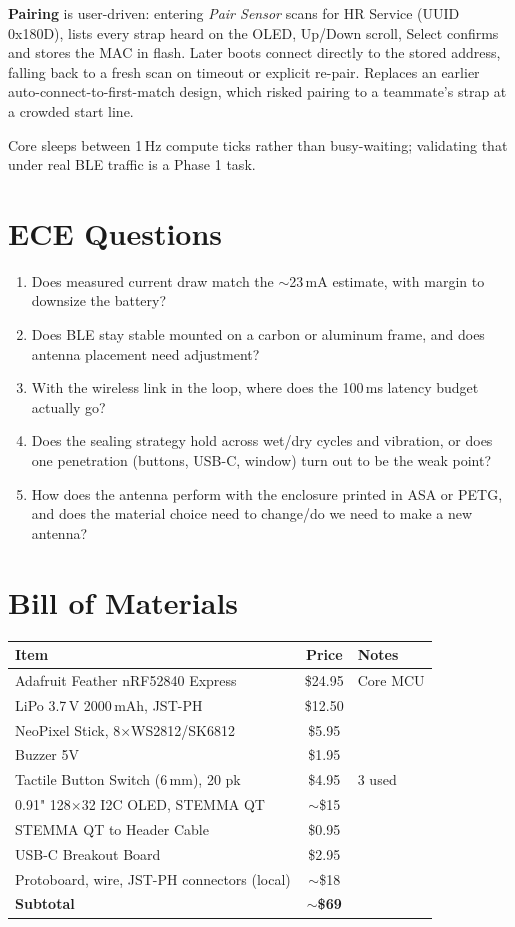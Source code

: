 \documentclass[11pt]{article}
\begin{document}
\textbf{Pairing} is user-driven: entering \emph{Pair Sensor} scans for HR Service (UUID 0x180D), lists every strap heard on the OLED, Up/Down scroll, Select confirms and stores the MAC in flash. Later boots connect directly to the stored address, falling back to a fresh scan on timeout or explicit re-pair. Replaces an earlier auto-connect-to-first-match design, which risked pairing to a teammate's strap at a crowded start line.

Core sleeps between 1\,Hz compute ticks rather than busy-waiting; validating that under real BLE traffic is a Phase 1 task.

\section{ECE Questions}
\begin{enumerate}[topsep=2pt,itemsep=3pt]
    \item Does measured current draw match the $\sim$23\,mA estimate, with margin to downsize the battery?
    \item Does BLE stay stable mounted on a carbon or aluminum frame, and does antenna placement need adjustment?
    \item With the wireless link in the loop, where does the 100\,ms latency budget actually go?
    \item Does the sealing strategy hold across wet/dry cycles and vibration, or does one penetration (buttons, USB-C, window) turn out to be the weak point?
    \item How does the antenna perform with the enclosure printed in ASA or PETG, and does the material choice need to change/do we need to make a new antenna?
\end{enumerate}

\section{Bill of Materials}
\begin{center}
\begin{tabular}{L{6.2cm} c L{5.5cm}}
\toprule
\textbf{Item} & \textbf{Price} & \textbf{Notes} \\
\midrule
Adafruit Feather nRF52840 Express & \$24.95 & Core MCU \\
LiPo 3.7\,V 2000\,mAh, JST-PH & \$12.50 & \\
NeoPixel Stick, 8$\times$WS2812/SK6812 & \$5.95 & \\
Buzzer 5V & \$1.95 & \\
Tactile Button Switch (6\,mm), 20 pk & \$4.95 & 3 used \\
0.91" 128$\times$32 I2C OLED, STEMMA QT & $\sim$\$15 & \\
STEMMA QT to Header Cable & \$0.95 & \\
USB-C Breakout Board & \$2.95 & \\
Protoboard, wire, JST-PH connectors (local) & $\sim$\$18 & \\
\midrule
\textbf{Subtotal} & $\sim$\textbf{\$69} & \\
\bottomrule
\end{tabular}
\end{center}
\end{document}
